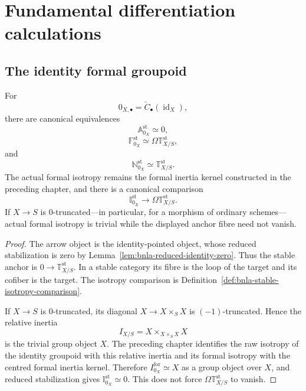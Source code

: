 \section{Fundamental differentiation calculations}
\label{sec:bnla-basic-calculations}

\subsection{The identity formal groupoid}

\begin{proposition}
\label{prop:bnla-zero-groupoid}
For
\[
    0_{X,\bullet}
    =
    \check C_\bullet(\operatorname{id}_X),
\]
there are canonical equivalences
\[
    \mathbb A^{\mathrm{st}}_{0_X}\simeq0,
\]
\[
    \boxed{
    \mathbb F^{\mathrm{st}}_{0_X}
    \simeq
    \Omega\mathbb T^{\mathrm{st}}_{X/S},}
\]
and
\[
    \boxed{
    \mathbb N^{\mathrm{st}}_{0_X}
    \simeq
    \mathbb T^{\mathrm{st}}_{X/S}.}
\]
The actual formal isotropy remains the formal inertia kernel constructed in the
preceding chapter, and there is a canonical comparison
\[
    \mathbb I^{\mathrm{st}}_{0_X}
    \longrightarrow
    \Omega\mathbb T^{\mathrm{st}}_{X/S}.
\]
If $X\to S$ is $0$-truncated---in particular, for a morphism of ordinary
schemes---actual formal isotropy is trivial while the displayed anchor fibre
need not vanish.
\end{proposition}

\begin{proof}
The arrow object is the identity-pointed object, whose reduced stabilization is
zero by Lemma~\ref{lem:bnla-reduced-identity-zero}.  Thus the stable anchor is
$0\to\mathbb T^{\mathrm{st}}_{X/S}$.  In a stable category its fibre is the
loop of the target and its cofiber is the target.  The isotropy comparison is
Definition~\ref{def:bnla-stable-isotropy-comparison}.

If $X\to S$ is $0$-truncated, its diagonal
$X\to X\times_SX$ is $(-1)$-truncated.  Hence the relative inertia
\[
    I_{X/S}
    =
    X\times_{X\times_SX}X
\]
is the trivial group object $X$.  The preceding chapter identifies the raw
isotropy of the identity groupoid with this relative inertia and its formal
isotropy with the centred formal inertia kernel.  Therefore
$I^{\mathrm{for}}_{0_X}\simeq X$ as a group object over $X$, and reduced
stabilization gives $\mathbb I^{\mathrm{st}}_{0_X}\simeq0$.  This does not
force $\Omega\mathbb T^{\mathrm{st}}_{X/S}$ to vanish.
\end{proof}

